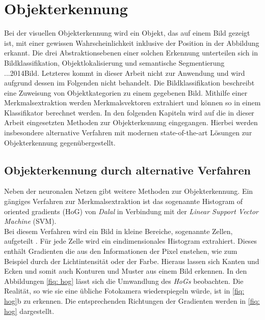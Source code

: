 		
		
		
		
		
	\section{Objekterkennung}
	\label{sec: Objekterkennung}
	Bei der visuellen Objekterkennung wird ein Objekt, das auf einem Bild gezeigt ist, mit einer gewissen Wahrscheinlichkeit inklusive der Position in der Abbildung erkannt. Die drei Abstraktionsebenen einer solchen Erkennung unterteilen sich in Bildklassifikation, Objektlokalisierung und semantische Segmentierung ...2014Bild. Letzteres kommt in dieser Arbeit nicht zur Anwendung und wird aufgrund dessen im Folgenden nicht behandelt. Die Bildklassifikation beschreibt eine Zuweisung von Objektkategorien zu einem gegebenen Bild. Mithilfe einer Merkmalsextraktion werden Merkmalsvektoren extrahiert und können so in einem Klassifikator berechnet werden. In den folgenden Kapiteln wird auf die in dieser Arbeit eingesetzten Methoden zur Objekterkennung eingegangen. Hierbei werden insbesondere alternative Verfahren mit modernen state-of-the-art Lösungen zur Objekterkennung gegenübergestellt.  
	
	
		\subsection{Objekterkennung durch alternative Verfahren}
		\label{subsec: Objekterkennung durch alternative Verfahren}	
		
		
		Neben der neuronalen Netzen gibt weitere Methoden zur Objekterkennung. Ein gängiges Verfahren zur Merkmalsextraktion ist das sogenannte Histogram of oriented gradients (HoG) von \textit{Dalal} in Verbindung mit der \textit{Linear Support Vector Machine} (SVM).\\
		
		Bei diesem Verfahren wird ein Bild in kleine Bereiche, sogenannte Zellen, aufgeteilt \cite{hogsvm}. Für jede Zelle wird ein eindimensionales Histogram extrahiert. Dieses enthält Gradienten die aus den Informationen der Pixel enstehen, wie zum Beispiel durch der Lichtintensität oder der Farbe. Hieraus lassen sich Kanten und Ecken und somit auch Konturen und Muster aus einem Bild erkennen. In den Abbildungen \ref{fiq: hog} lässt sich die Umwandlung des \textit{HoGs} beobachten. Die Realität, so wie sie eine übliche Fotokamera wiederspiegeln würde, ist in \ref{fiq: hog}b zu erkennen. Die entsprechenden Richtungen der Gradienten werden in \ref{fiq: hog} dargestellt. \\
		
